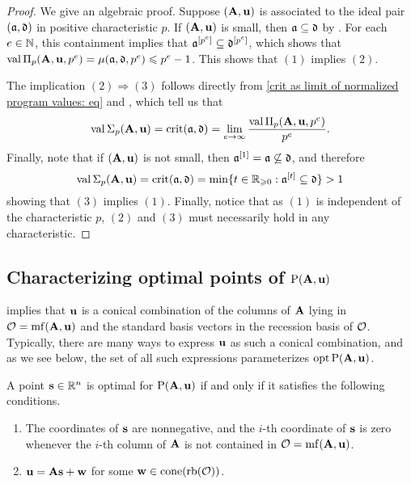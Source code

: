 \documentclass{amsart}
\begin{document}
\begin{proof}
   We give an algebraic proof.
   Suppose $(\mathbf{A},\mathbf{u})$ is associated to the ideal pair $(\mathfrak{a}, \mathfrak{d})$ in positive characteristic $p$.
   If $(\mathbf{A}, \mathbf{u})$ is small, then $\mathfrak{a} \subseteq \mathfrak{d}$ by .
   For each $e\in \mathbb{N}$, this containment implies that $\mathfrak{a}^{[p^e]} \subseteq \mathfrak{d}^{[p^e]}$, which shows that $\operatorname{val} \Pi_p(\mathbf{A}, \mathbf{u}, p^e) = \mu(\mathfrak{a}, \mathfrak{d}, p^e) \leqslant p^e-1$.
   This shows that $(1)$ implies $(2)$.

   The implication $(2) \Rightarrow (3)$ follows directly from \eqref{crit as limit of normalized program values: eq} and , which tell us that
   \[\operatorname{val} \Sigma_p(\mathbf{A},\mathbf{u}) = \operatorname{crit}(\mathfrak{a},\mathfrak{d}) = \lim_{e \to \infty} \frac{\operatorname{val} \Pi_p(\mathbf{A}, \mathbf{u}, p^e)}{p^e}.\]
   Finally, note that if $(\mathbf{A},\mathbf{u})$ is not small, then $\mathfrak{a}^{[1]} = \mathfrak{a}  \not\subseteq \mathfrak{d}$, and therefore
   \[\operatorname{val} \Sigma_p(\mathbf{A},\mathbf{u}) = \operatorname{crit}(\mathfrak{a},\mathfrak{d}) = \min\{t\in \mathbb{R}_{\geqslant 0}: \mathfrak{a}^{[t]} \subseteq \mathfrak{d}\} > 1\]
   showing that $(3)$ implies $(1)$.
   Finally, notice that as $(1)$ is independent of the characteristic $p$, $(2)$ and $(3)$ must necessarily hold in any characteristic.
\end{proof}

\subsection{Characterizing optimal points of $\mathrm{P}(\mathbf{A},\mathbf{u})$}

 implies that $\mathbf{u}$ is a conical combination of the columns of $\mathbf{A}$ lying in $\mathcal{O} = \operatorname{mf}(\mathbf{A},\mathbf{u})$ and the standard basis vectors in the recession basis of $\mathcal{O}$.
Typically, there are many ways to express $\mathbf{u}$ as such a conical combination, and as we see below, the set of all such expressions parameterizes  $\operatorname{opt} \mathrm{P}(\mathbf{A}, \mathbf{u})$.

\begin{proposition}
   \label{opt set: P}
   A point $\mathbf{s} \in \mathbb{R}^n$ is optimal for $\mathrm{P}(\mathbf{A}, \mathbf{u})$ if and only if it satisfies the following conditions.
\begin{enumerate}[$(1)$]
\item  \label{mc coords: e} The coordinates of $\mathbf{s}$ are nonnegative, and the $i$-th coordinate of $\mathbf{s}$ is zero whenever the $i$-th column of $\mathbf{A}$ is not contained in $\mathcal{O} = \operatorname{mf}(\mathbf{A}, \mathbf{u})$.
\item  \label{mc decomposition: e} $\mathbf{u} = \mathbf{A} \mathbf{s} + \mathbf{w}$ for some $\mathbf{w} \in  \operatorname{cone}(\operatorname{rb}(\mathcal{O}))$.
\end{enumerate}
\end{proposition}
\end{document}

